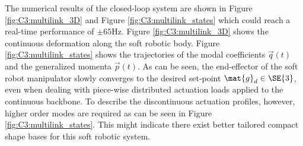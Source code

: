 The numerical results of the closed-loop system are shown in Figure \ref{fig:C3:multilink_3D} and Figure \ref{fig:C3:multilink_states} which could reach a real-time performance of $\pm65$Hz. Figure \ref{fig:C3:multilink_3D} shows the continuous deformation along the soft robotic body. Figure \ref{fig:C3:multilink_states} shows the trajectories of the modal coefficients $\vec{q}(t)$ and the generalized momenta $\vec{p}(t)$. As can be seen, the end-effector of the soft robot manipulator slowly converges to the desired set-point $\mat{g}_d \in \SE{3}$, even when dealing with piece-wise distributed actuation loads applied to the continuous backbone. To describe the discontinuous actuation profiles, however, higher order modes are required as can be seen in Figure \ref{fig:C3:multilink_states}. This might indicate there exist better tailored compact shape bases for this soft robotic system.
%
\clearpage
